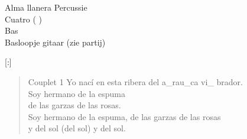 \begin{song}[joropo]{Alma llanera}
Percussie\\
Cuatro ( )\\
Bas\\
Basloopje gitaar (zie partij)\\

\begin{instrumental}{}
   \measure{}[:]  \measure{}  \measure{} 
\end{instrumental}

\begin{verse}{Couplet 1}
Yo nací en esta ribera del a\_rau\_ca vi\_  brador. \hspace{1em}  \hspace{1em}  \hspace{1em}\\
  Soy hermano de la espuma  \hspace{1em} \hspace{1em}  \hspace{1em}\\
  de las garzas de las rosas.  \hspace{1em} \hspace{1em}  \hspace{1em}\\
  Soy hermano de la espuma, de las garzas de las rosas\\
y del sol (del sol) y del sol.   \hspace{\wlskip}\\
\end{verse}


\end{song}
